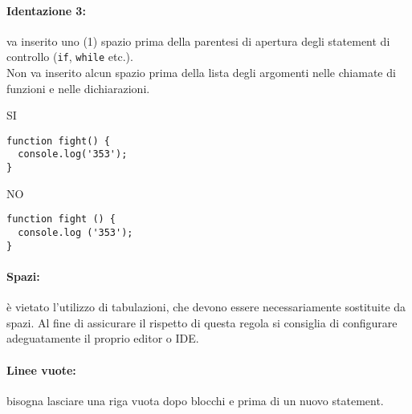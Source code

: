 \documentclass[../ProcessiPrimari.tex]{subfiles}
\begin{document}
\paragraph*{Identazione 3: }
va inserito uno (1) spazio prima della parentesi di apertura degli statement di controllo (\texttt{if}, \texttt{while} etc.). \\
Non va inserito alcun spazio prima della lista degli argomenti nelle chiamate di funzioni e nelle dichiarazioni.\\

\begin{center}{
\begin{minipage}{5cm}
{\begin{center}SI\end{center}}
\begin{Verbatim}[frame=single]
function fight() {
  console.log('353');
}
\end{Verbatim}
\end{minipage}
\hfil
\begin{minipage}{5cm}
{\begin{center}NO\end{center}}
\begin{Verbatim}[frame=single]
function fight () {
  console.log ('353');
}
\end{Verbatim}
\end{minipage}
}
\end{center}


\paragraph*{Spazi: }
è vietato l'utilizzo di tabulazioni, che devono essere necessariamente sostituite da spazi. Al fine di assicurare il rispetto di questa regola si consiglia di configurare adeguatamente il proprio editor o IDE.
\paragraph*{Linee vuote: }
bisogna lasciare una riga vuota dopo blocchi e prima di un nuovo statement.
\end{document}
